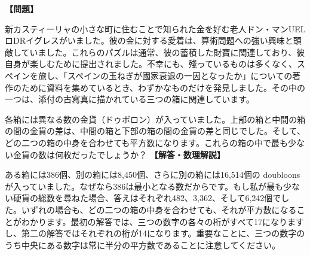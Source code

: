 \documentclass[10pt,a4paper,oneside,openany]{ltjsbook}
\begin{document}
\begin{tcolorbox}[colback=softblue,colframe=primaryblue,title=\textbf{第 131 問：THE SPANISH MISER.},arc=2mm,boxrule=1pt,breakable]
\textbf{【問題】}\par\vspace{0.3em}
新カスティーリャの小さな町に住むことで知られた金を好む老人ドン・マンUELロDRイグレスがいました。彼の金に対する愛着は、算術問題への強い興味と頭敵していました。これらのパズルは通常、彼の蓄積した財寶に関連しており、彼自身が楽しむために提出されました。不幸にも、殘っているものは多くなく、スペインを旅し、「スペインの玉ねぎが國家衰退の一因となったか」についての著作のために資料を集めているとき、わずかなものだけを発見しました。その中の一つは、添付の古寫真に描かれている三つの箱に関連しています。

各箱には異なる数の金貨（ドゥボロン）が入っていました。上部の箱と中間の箱の間の金貨の差は、中間の箱と下部の箱の間の金貨の差と同じでした。そして、どの二つの箱の中身を合わせても平方数になります。これらの箱の中で最も少ない金貨の数は何枚だったでしょうか？
\tcblower
\textbf{【解答・数理解説】}\par\vspace{0.3em}
ある箱には386個、別の箱には8,450個、さらに別の箱には16,514個の doubloons が入っていました。なぜなら386は最小となる数だからです。もし私が最も少ない硬貨の総数を尋ねた場合、答えはそれぞれ482、3,362、そして6,242個でした。いずれの場合も、どの二つの箱の中身を合わせても、それが平方数になることがわかります。最初の解答では、三つの数字の各々の桁がすべて17になりますし、第二の解答ではそれぞれの桁が14になります。重要なことに、三つの数字のうち中央にある数字は常に半分の平方数であることに注意してください。
\end{tcolorbox}
\end{document}
